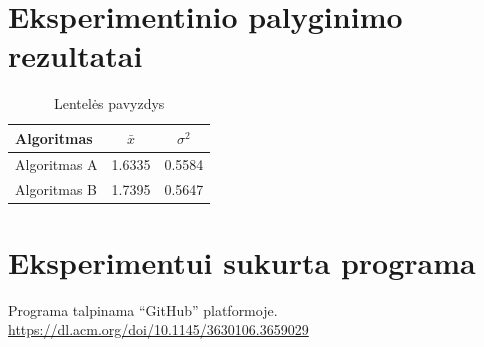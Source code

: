 \documentclass{VUMIFInfKursinis}
\begin{document}
\section{Eksperimentinio palyginimo rezultatai}
\begin{table}[H]\footnotesize
  \centering
  \caption{Lentelės pavyzdys}    %
  {\begin{tabular}{|l|c|c|} \hline
    Algoritmas & $\bar{x}$ & $\sigma^{2}$ \\
    \hline
    Algoritmas A  & 1.6335    & 0.5584       \\
    Algoritmas B  & 1.7395    & 0.5647       \\
    \hline
  \end{tabular}}
  \label{tab:table example}
\end{table}


\section{Eksperimentui sukurta programa}
Programa talpinama \enquote{GitHub} platformoje. \url{https://dl.acm.org/doi/10.1145/3630106.3659029}
\end{document}
